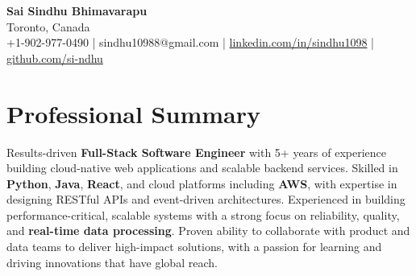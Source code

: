 \documentclass[letterpaper,11pt]{article}
\begin{document}
\begin{center}
  {\Large \textbf{Sai Sindhu Bhimavarapu}} \\
  Toronto, Canada \\
  +1-902-977-0490 \enspace | \enspace sindhu10988@gmail.com \enspace | \enspace \href{https://www.linkedin.com/in/sindhu1098/}{linkedin.com/in/sindhu1098} \enspace | \enspace \href{https://github.com/si-ndhu}{github.com/si-ndhu}
\end{center}

\section{Professional Summary}
  \begin{itemize}[leftmargin=0.15in, label={}]
    \small{\item{
     Results-driven \textbf{Full-Stack Software Engineer} with 5+ years of experience building cloud-native web applications and scalable backend services. Skilled in \textbf{Python}, \textbf{Java}, \textbf{React}, and cloud platforms including \textbf{AWS}, with expertise in designing RESTful APIs and event-driven architectures. Experienced in building performance-critical, scalable systems with a strong focus on reliability, quality, and \textbf{real-time data processing}. Proven ability to collaborate with product and data teams to deliver high-impact solutions, with a passion for learning and driving innovations that have global reach.
    }}
  \end{itemize}
\vspace{-16pt}

\end{document}
